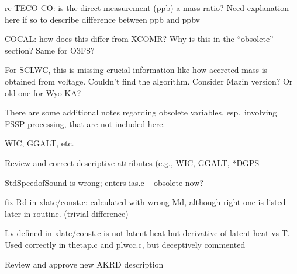 \documentclass[
  english,
]{book}
\begin{document}
re TECO CO: is the direct measurement (ppb) a mass ratio? Need explanation here if so to describe difference between ppb and ppbv

COCAL: how does this differ from XCOMR? Why is this in the ``obsolete'' section? Same for O3FS?

For SCLWC, this is missing crucial information like how accreted mass is obtained from voltage. Couldn't find the algorithm. Consider Mazin version? Or old one for Wyo KA?

There are some additional notes regarding obsolete variables, esp.~involving FSSP processing, that are not included here.

WIC, GGALT, etc.

Review and correct descriptive attributes (e.g., WIC, GGALT, *DGPS

StdSpeedofSound is wrong; enters ias.c -- obsolete now?

fix Rd in xlate/const.c: calculated with wrong Md, although right one is listed later in routine. (trivial difference)

Lv defined in xlate/const.c is not latent heat but derivative of latent heat vs T. Used correctly in thetap.c and plwcc.c, but deceptively commented

Review and approve new AKRD description

  
\end{document}
